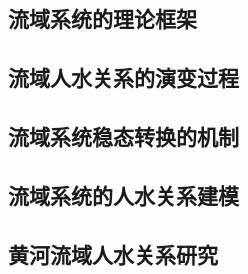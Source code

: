 \subsection{流域系统的理论框架}\label{ch1:sec:theories}


\subsection{流域人水关系的演变过程}\label{ch1:sec:process}


\subsection{流域系统稳态转换的机制}\label{ch1:sec:mechanism}


\subsection{流域系统的人水关系建模}\label{ch1:sec:model}


\subsection{黄河流域人水关系研究}\label{ch1:sec:yellow_river}
